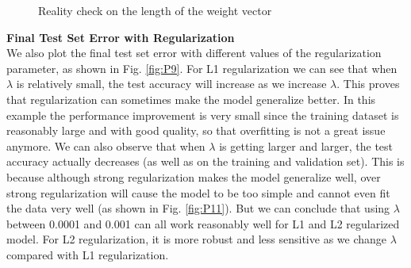\documentclass{article} %
\begin{document}
\begin{figure}[h]%
	\centering
	\qquad
	\caption{Reality check on the length of the weight vector}%
	\label{fig:P4}%
\end{figure}

\textbf{Final Test Set Error with Regularization}\\
We also plot the final test set error with different values of the regularization parameter, as shown in Fig. \ref{fig:P9}. For L1 regularization we can see that when $\lambda$ is relatively small, the test accuracy will increase as we increase $\lambda$. This proves that regularization can sometimes make the model generalize better. In this example the performance improvement is very small since the training dataset is reasonably large and with good quality, so that overfitting is not a great issue anymore. We can also observe that when $\lambda$ is getting larger and larger, the test accuracy actually decreases (as well as on the training and validation set). This is because although strong regularization makes the model generalize well, over strong regularization will cause the model to be too simple and cannot even fit the data very well (as shown in Fig. \ref{fig:P11}). But we can conclude that using $\lambda$ between 0.0001 and 0.001 can all work reasonably well for L1 and L2 regularized model. For L2 regularization, it is more robust and less sensitive as we change $\lambda$ compared with L1 regularization.
\end{document}

